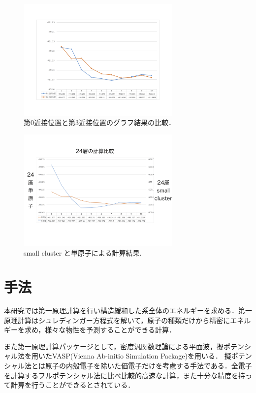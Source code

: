 \documentclass[a4j,twocolumn]{jsarticle}
\begin{document}
\begin{figure}[h]
\vspace{0\baselineskip}
\begin{center}
   \includegraphics[width=80mm]{0_3garaf.png}
  \caption{第0近接位置と第3近接位置のグラフ結果の比較\cite{tochigi}．\label{glaf}}
  \label{fig:one}
\end{center}
\end{figure}

\begin{figure}[h]
\vspace{0\baselineskip}
\begin{center}
   \includegraphics[width=80mm]{24_small_single.png}
  \caption{small cluster と単原子による計算結果\cite{tochigi}. \label{glaf}}
  \label{fig:two}
\end{center}
\end{figure}

\section{手法}

本研究では第一原理計算を行い構造緩和した系全体のエネルギーを求める．第一原理計算はシュレディンガー方程式を解いて，原子の種類だけから精密にエネルギーを求め，様々な物性を予測することができる計算．

また第一原理計算パッケージとして，密度汎関数理論による平面波，擬ポテンシャル法を用いたVASP(Vienna Ab-initio Simulation Package)を用いる．
擬ポテンシャル法とは原子の内殻電子を除いた価電子だけを考慮する手法である．全電子を計算するフルポテンシャル法に比べ比較的高速な計算，また十分な精度を持って計算を行うことができるとされている．
\end{document}

